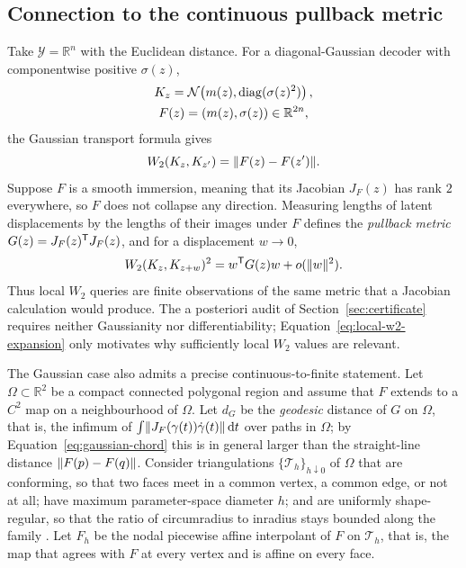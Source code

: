 \subsection{Connection to the continuous pullback metric}

Take $\mathcal Y=\mathbb R^n$ with the Euclidean distance.  For a
diagonal-Gaussian decoder with componentwise positive $\sigma(z)$,
\begin{equation}
 \begin{gathered}
 K_z=\mathcal N\!\left(m(z),\operatorname{diag}(\sigma(z)^2)\right),\\
 F(z)=(m(z),\sigma(z))\in\mathbb R^{2n},
 \end{gathered}
 \label{eq:diagonal-gaussian-decoder}
\end{equation}
the Gaussian transport formula gives \cite{givensshortt1984,takatsu2011}
\begin{equation}
 W_2(K_z,K_{z'})=\lVert F(z)-F(z')\rVert.
 \label{eq:gaussian-chord}
\end{equation}
Suppose $F$ is a smooth immersion, meaning that its Jacobian $J_F(z)$ has
rank $2$ everywhere, so $F$ does not collapse any direction.  Measuring
lengths of latent displacements by the lengths of their images under $F$
defines the \emph{pullback metric} $G(z)=J_F(z)^{\mathsf{T}}J_F(z)$, and for a
displacement $w\to0$,
\begin{equation}
 W_2(K_z,K_{z+w})^2
 =w^{\mathsf{T}}G(z)w+o(\lVert w\rVert^2).
 \label{eq:local-w2-expansion}
\end{equation}
Thus local $W_2$ queries are finite observations of the same metric that a
Jacobian calculation would produce.  The a posteriori audit of
Section~\ref{sec:certificate} requires neither Gaussianity nor
differentiability; Equation~\eqref{eq:local-w2-expansion} only motivates why
sufficiently local $W_2$ values are relevant.

The Gaussian case also admits a precise continuous-to-finite statement.  Let
$\Omega\subset\mathbb R^2$ be a compact connected polygonal region and assume
that $F$ extends to a $C^2$ map on a neighbourhood of $\Omega$.  Let $d_G$ be
the \emph{geodesic} distance of $G$ on $\Omega$, that is, the infimum of
$\int\lVert J_F(\gamma(t))\dot\gamma(t)\rVert\,\mathrm{d} t$ over paths in $\Omega$; by
Equation~\eqref{eq:gaussian-chord} this is in general larger than the
straight-line distance $\lVert F(p)-F(q)\rVert$.  Consider triangulations
$\{\mathcal T_h\}_{h\downarrow0}$ of $\Omega$ that are conforming, so that two
faces meet in a common vertex, a common edge, or not at all; have maximum
parameter-space diameter $h$; and are uniformly shape-regular, so that the
ratio of circumradius to inradius stays bounded along the family
\cite{ciarlet1978}.  Let $F_h$ be the nodal piecewise affine interpolant of
$F$ on $\mathcal T_h$, that is, the map that agrees with $F$ at every vertex
and is affine on every face.

